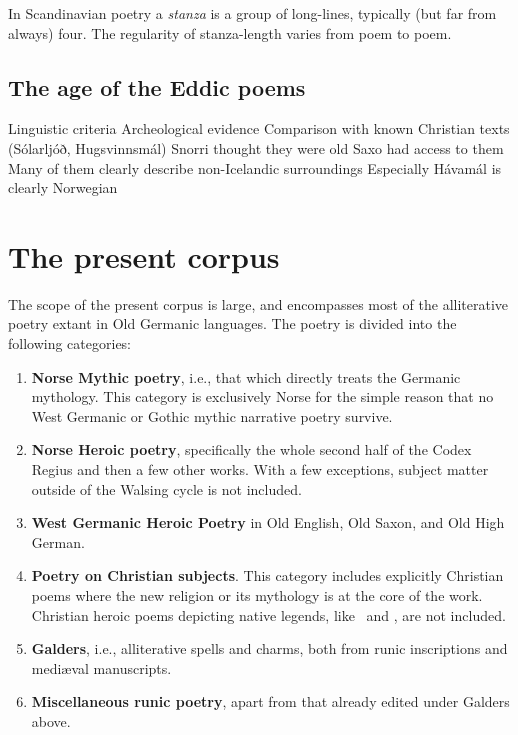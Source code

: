     In Scandinavian poetry a \emph{stanza} is a group of long-lines, typically (but far from always) four.  The regularity of stanza-length varies from poem to poem.


  \subsection{The age of the Eddic poems}%
    Linguistic criteria
    Archeological evidence
    Comparison with known Christian texts (Sólarljóð, Hugsvinnsmál)
    Snorri thought they were old
    Saxo had access to them
    Many of them clearly describe non-Icelandic surroundings
      Especially Hávamál is clearly Norwegian


\section{The present corpus}
  The scope of the present corpus is large, and encompasses most of the alliterative poetry extant in Old Germanic languages.  The poetry is divided into the following categories:
  \begin{enumerate}
    \item \textbf{Norse Mythic poetry}, i.e., that which directly treats the Germanic mythology.  This category is exclusively Norse for the simple reason that no West Germanic or Gothic mythic narrative poetry survive.
    \item \textbf{Norse Heroic poetry}, specifically the whole second half of the Codex Regius and then a few other works.  With a few exceptions, subject matter outside of the Walsing cycle is not included.
    \item \textbf{West Germanic Heroic Poetry} in Old English, Old Saxon, and Old High German.
    \item \textbf{Poetry on Christian subjects}.  This category includes explicitly Christian poems where the new religion or its mythology is at the core of the work.  Christian heroic poems depicting native legends, like \Beowulf\ and \Hildebrandslied, are not included.
    \item \textbf{Galders}, i.e., alliterative spells and charms, both from runic inscriptions and mediæval manuscripts.
    \item \textbf{Miscellaneous runic poetry}, apart from that already edited under Galders above.
  \end{enumerate}


